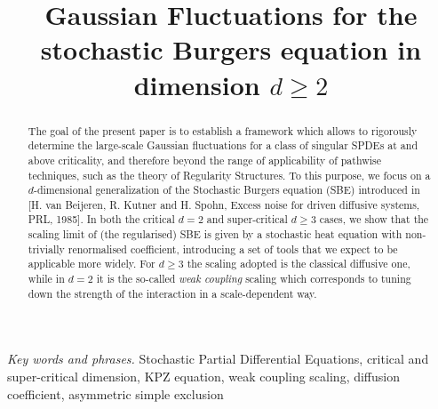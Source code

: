 \documentclass[reqno,11pt]{preprint}
\title{Gaussian Fluctuations for the stochastic Burgers equation in dimension $d\geq 2$}
\newcommand{\1}{\mathds{1}}
\begin{document}
\maketitle

\vspace{-2cm}

\newline


\newline

\begin{abstract}
The goal of the present paper is to %
establish a framework which allows to rigorously determine the large-scale Gaussian  
fluctuations for a class of singular SPDEs at and above criticality, and therefore beyond 
the range of applicability of pathwise techniques, such as the theory of Regularity Structures. 
To this purpose, we focus on a $d$-dimensional generalization of the Stochastic Burgers equation (SBE) 
introduced in [H. van Beijeren, R. Kutner and H. Spohn, Excess noise for driven diffusive systems, PRL, 1985]. 
In both the critical $d=2$ and super-critical $d\geq 3$ cases, we show that the scaling limit of 
(the regularised) SBE is given by a stochastic heat equation with non-trivially renormalised coefficient, 
introducing a set of tools that we expect to be applicable more widely. 
For $d\ge3$  the scaling adopted is the classical diffusive one, while in $d=2$ it is the 
so-called {\it weak coupling} scaling which corresponds to tuning down the strength of the interaction 
in a scale-dependent way. 
%
%
%
%
\end{abstract}

\bigskip\noindent
{\it Key words and phrases.}
Stochastic Partial Differential Equations, critical and super-critical dimension, KPZ equation, weak coupling scaling, 
diffusion coefficient,  asymmetric simple exclusion 
\bigskip
\end{document}
